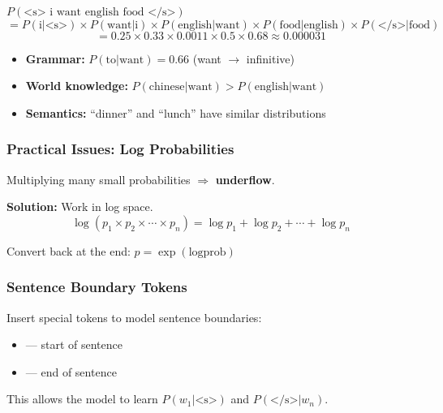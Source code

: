 \begin{exbox}
$P(\text{<s> i want english food </s>})$
\[
= P(\text{i}|\text{<s>}) \times P(\text{want}|\text{i}) \times P(\text{english}|\text{want}) \times P(\text{food}|\text{english}) \times P(\text{</s>}|\text{food})
\]
\[
= 0.25 \times 0.33 \times 0.0011 \times 0.5 \times 0.68 \approx 0.000031
\]
\end{exbox}

\begin{tipbox}
\begin{itemize}
  \item \textbf{Grammar:} $P(\text{to}|\text{want}) = 0.66$ (want $\to$ infinitive)
  \item \textbf{World knowledge:} $P(\text{chinese}|\text{want}) > P(\text{english}|\text{want})$
  \item \textbf{Semantics:} ``dinner'' and ``lunch'' have similar distributions
\end{itemize}
\end{tipbox}

\separator

\subsubsection{Practical Issues: Log Probabilities}

\begin{defbox}
Multiplying many small probabilities $\Rightarrow$ \textbf{underflow}.

\textbf{Solution:} Work in log space.
\[
\log(p_1 \times p_2 \times \cdots \times p_n) = \log p_1 + \log p_2 + \cdots + \log p_n
\]

Convert back at the end: $p = \exp(\text{logprob})$
\end{defbox}

\separator

\subsubsection{Sentence Boundary Tokens}

\begin{defbox}
Insert special tokens to model sentence boundaries:
\begin{itemize}
  \item {} --- start of sentence
  \item {} --- end of sentence
\end{itemize}

This allows the model to learn $P(w_1 | \text{<s>})$ and $P(\text{</s>} | w_n)$.
\end{defbox}

